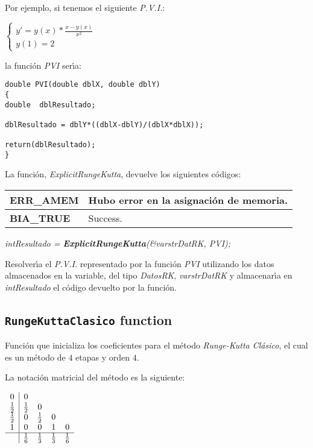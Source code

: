 Por ejemplo, si tenemos el siguiente \emph{P.V.I.}:

\begin{center}
$
\left \{ \begin{array}{l}
y' = y(x) * \frac{x-y(x)}{x^2} \\
y(1) = 2
\end{array} \right.
$
\end{center}

la funci\'on \emph{PVI} ser\'{\i}a:

\begin{verbatim}
double PVI(double dblX, double dblY)
{
double  dblResultado;

dblResultado = dblY*((dblX-dblY)/(dblX*dblX));

return(dblResultado);
}
\end{verbatim}

La funci\'on, \emph{ExplicitRungeKutta}, devuelve los siguientes c\'odigos:

\begin{center}
\begin{tabular}{|l|l|}
\hline
\textbf{ERR\_AMEM} & Hubo error en la asignaci\'on de memoria. \\
\hline
\textbf{BIA\_TRUE} & Success. \\
\hline
\end{tabular}
\end{center}

\begin{center}
\emph{intResultado = \textbf{ExplicitRungeKutta}(\&varstrDatRK, PVI);}
\end{center}

Resolver\'{\i}a el \emph{P.V.I.} representado por la funci\'on \emph{PVI} 
utilizando los datos almacenados en la variable, del tipo \emph{DatosRK},
\emph{varstrDatRK} y almacenar\'{\i}a en \emph{intResultado} el c\'odigo
devuelto por la funci\'on.

\subsection{\texttt{RungeKuttaClasico} function}

Funci\'on que inicializa los coeficientes para el m\'etodo \emph{Runge-Kutta 
Cl\'asico}, el cual es un m\'etodo de $4$ etapas y orden $4$.\newline

La notaci\'on matricial del m\'etodo es la siguiente:

\begin{center}
$
\begin{array}{c|cccc}
0 & 0 \\
\frac{1}{2} & \frac{1}{2} & 0 \\
\frac{1}{2} & 0 & \frac{1}{2} & 0 \\
1 & 0 & 0 & 1 & 0 \\
\hline
 & \frac{1}{6} & \frac{1}{3} & \frac{1}{3} & \frac{1}{6} \\
\end{array}
$
\end{center}


